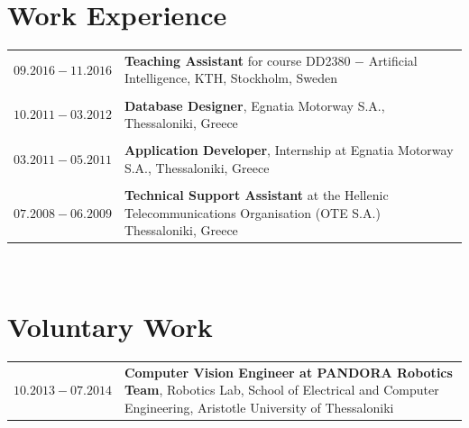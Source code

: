 \documentclass[a4paper,10pt,twoside]{article}
\begin{document}

\section{Work Experience}

\begin{tabular}{rp{12cm}}
$09.2016 - 11.2016$ & \textbf{Teaching Assistant} for course DD2380 $-$ Artificial Intelligence, KTH, Stockholm, Sweden\\
&\\
$10.2011 - 03.2012$ & \textbf{Database Designer}, Egnatia Motorway S.A., Thessaloniki, Greece \\
&\\
$03.2011 - 05.2011$ & \textbf{Application Developer}, Internship at Egnatia Motorway S.A., Thessaloniki, Greece\\
&\\
$07.2008 - 06.2009$ & \textbf{Technical Support Assistant} at the Hellenic Telecommunications
Organisation (OTE S.A.) Thessaloniki, Greece\\
\end{tabular} \\



\section{Voluntary Work}

\begin{tabular}{rp{12cm}}
$10.2013 - 07.2014$ & \textbf{Computer Vision Engineer at PANDORA Robotics Team}, Robotics Lab,
School of Electrical and Computer Engineering, Aristotle University of Thessaloniki \\
\end{tabular} \\



\end{document}

